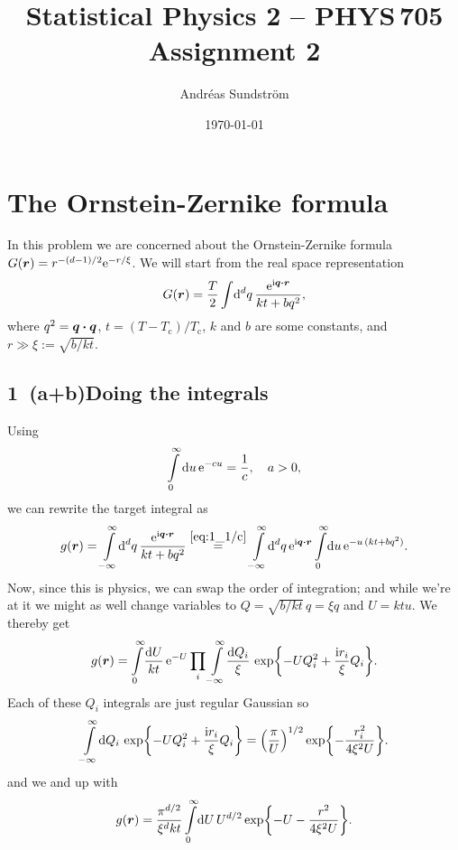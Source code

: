 \documentclass[11pt,letter, swedish, english
]{article}
\newcommand{\Tc}{\ensuremath{T_{\text{c}}}}
\begin{document}




\title{Statistical Physics 2 -- PHYS\,705 \\
Assignment 2}
\author{Andréas Sundström}
\date{\today}

\maketitle


\section{The Ornstein-Zernike formula}
In this problem we are concerned about the Ornstein-Zernike formula 
$G(\vb*r)=r^{-(d-1)/2}\mathrm{e}^{-r/\xi}$. We will start from the real space
representation 
\begin{equation}\label{eq:1_start}
G(\vb*r) = \frac{T}{2}\int\!\rd^dq\,\frac{\ee^{\ii\vb*q\vdot\vb*r}}{kt+bq^2},
\end{equation}
where $q^2=\vb*q\vdot\vb*q$, $t=(T-\Tc)/\Tc$, $k$ and $b$ are some
constants, and $r\gg\xi:=\sqrt{b/kt}$.

\subsection*{1~(a+b)\quad Doing the integrals}\addtocounter{subsection}{2}
Using 
\begin{equation}\label{eq:1_1/c}
\int_0^\infty\rd{u}\,\ee^{-cu}=\frac{1}{c}
\qcomma a>0,
\end{equation}
we can rewrite the target integral as
\begin{equation}
g(\vb*r)=\int_{-\infty}^\infty\!\rd^dq\,
\frac{\ee^{\ii\vb*q\vdot\vb*r}}{kt+bq^2}
\stackrel{\eqref{eq:1_1/c}}{=}
\int_{-\infty}^\infty\!\rd^dq\, \ee^{\ii\vb*q\vdot\vb*r}
\int_0^\infty\!\rd{u}\,\ee^{-u\,(kt+bq^2)}.
\end{equation}
Now, since this is physics\footnotemark{}, we can swap the order of
integration; and while we're at it we might as well change variables
to $Q=\sqrt{b/kt}\,q=\xi q$ and $U=ktu$. We thereby get
\begin{equation}
g(\vb*r)=\int_0^\infty\!\frac{\rd{U}}{kt}\,\ee^{-U}
\prod_i\int_{-\infty}^\infty\!\frac{\rd{Q}_i}{\xi}\,
 \exp{-UQ_i^2+\frac{\ii r_i}{\xi}Q_i}.
\end{equation}
Each of these $Q_i$ integrals are just regular Gaussian so
\begin{equation}
\int_{-\infty}^\infty\!\rd{Q}_i\,
 \exp{-UQ_i^2+\frac{\ii r_i}{\xi}Q_i}
=\qty(\frac{\pi}{U})^{1/2}\exp{-\frac{r_i^2}{4\xi^2U}}.
\end{equation}
and we and up with
\begin{equation}\label{eq:1b_end}
g(\vb*r)=\frac{\pi^{d/2}}{\xi^d kt}\int_0^\infty\!\rd{U}\,
U^{d/2}\exp{-U-\frac{r^2}{4\xi^2U}}.
\end{equation}
\end{document}
